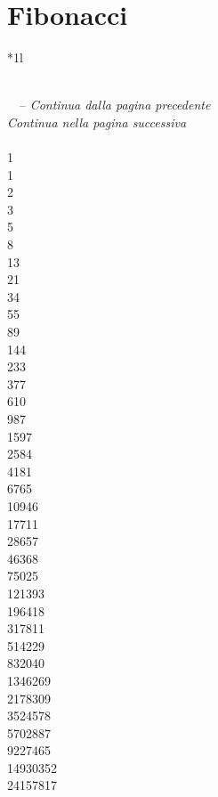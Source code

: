 
\chapter{Fibonacci}
\begin{longtable}{*{1}{l}}\toprule
\caption{Numeri di Fibonacci}\\
\midrule
\endfirsthead
{} {\tablename\ \thetable\ -- \textit{Continua dalla pagina precedente}} \\
\toprule
\endhead
\bottomrule
{} {\textit{Continua nella pagina successiva}} \\
\endfoot
{}\\
1\\
1\\
2\\
3\\
5\\
8\\
13\\
21\\
34\\
55\\
89\\
144\\
233\\
377\\
610\\
987\\
1597\\
2584\\
4181\\
6765\\
10946\\
17711\\
28657\\
46368\\
75025\\
121393\\
196418\\
317811\\
514229\\
832040\\
1346269\\
2178309\\
3524578\\
5702887\\
9227465\\
14930352\\
24157817\\

\end{longtable}
